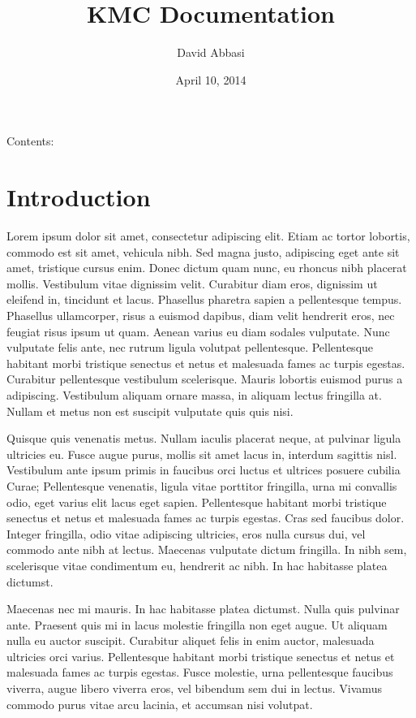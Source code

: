 \documentclass[letterpaper,10pt,english]{sphinxmanual}
\title{KMC Documentation}
\date{April 10, 2014}
\author{David Abbasi}
\begin{document}
\maketitle
\tableofcontents
{}\label{index::doc}


Contents:


\chapter{Introduction}
\label{intro:introduction}\label{intro:welcome-to-kmc-s-documentation}\label{intro::doc}
Lorem ipsum dolor sit amet, consectetur adipiscing elit. Etiam ac tortor
lobortis, commodo est sit amet, vehicula nibh. Sed magna justo, adipiscing eget
ante sit amet, tristique cursus enim. Donec dictum quam nunc, eu rhoncus nibh
placerat mollis. Vestibulum vitae dignissim velit. Curabitur diam eros,
dignissim ut eleifend in, tincidunt et lacus. Phasellus pharetra sapien a
pellentesque tempus. Phasellus ullamcorper, risus a euismod dapibus, diam velit
hendrerit eros, nec feugiat risus ipsum ut quam. Aenean varius eu diam sodales
vulputate. Nunc vulputate felis ante, nec rutrum ligula volutpat pellentesque.
Pellentesque habitant morbi tristique senectus et netus et malesuada fames ac
turpis egestas. Curabitur pellentesque vestibulum scelerisque. Mauris lobortis
euismod purus a adipiscing. Vestibulum aliquam ornare massa, in aliquam lectus
fringilla at. Nullam et metus non est suscipit vulputate quis quis nisi.

Quisque quis venenatis metus. Nullam iaculis placerat neque, at pulvinar ligula
ultricies eu. Fusce augue purus, mollis sit amet lacus in, interdum sagittis
nisl. Vestibulum ante ipsum primis in faucibus orci luctus et ultrices posuere
cubilia Curae; Pellentesque venenatis, ligula vitae porttitor fringilla, urna
mi convallis odio, eget varius elit lacus eget sapien. Pellentesque habitant
morbi tristique senectus et netus et malesuada fames ac turpis egestas. Cras
sed faucibus dolor. Integer fringilla, odio vitae adipiscing ultricies, eros
nulla cursus dui, vel commodo ante nibh at lectus. Maecenas vulputate dictum
fringilla. In nibh sem, scelerisque vitae condimentum eu, hendrerit ac nibh. In
hac habitasse platea dictumst.

Maecenas nec mi mauris. In hac habitasse platea dictumst. Nulla quis pulvinar
ante. Praesent quis mi in lacus molestie fringilla non eget augue. Ut aliquam
nulla eu auctor suscipit. Curabitur aliquet felis in enim auctor, malesuada
ultricies orci varius. Pellentesque habitant morbi tristique senectus et netus
et malesuada fames ac turpis egestas. Fusce molestie, urna pellentesque
faucibus viverra, augue libero viverra eros, vel bibendum sem dui in lectus.
Vivamus commodo purus vitae arcu lacinia, et accumsan nisi volutpat.
\end{document}
